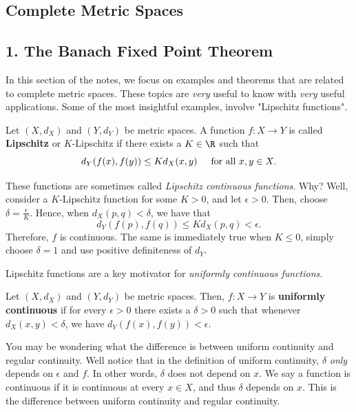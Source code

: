 
\subsection*{Complete Metric Spaces}

\subsection*{1.  The Banach Fixed Point Theorem}

In this section of the notes, we focus on examples and theorems that are related to complete metric spaces. These topics are \textit{very} useful to know with \textit{very} useful applications. Some of the most insightful examples, involve "Lipschitz functions".

\begin{definition}[Lipschitz]
Let $(X,d_X)$ and $(Y, d_Y)$ be metric spaces. A function $f: X\to Y$ is called \textbf{Lipschitz} or $K$-Lipschitz if there exists a $K\in \R$ such that 
\[
d_Y(f(x),f(y)) \leq Kd_X(x,y)\hspace{.5cm} \text{for all }x,y\in X.
\]
\end{definition}

These functions are sometimes called \textit{Lipschitz continuous functions}. Why? Well, consider a $K$-Lipschitz function for some $K>0$, and let $\epsilon >0$. Then, choose $\delta = \frac{\epsilon}{K}$. Hence, when $d_X(p,q) < \delta$, we have that 
\[
d_Y(f(p),f(q)) \leq Kd_X(p,q) < \epsilon.
\]
Therefore, $f$ is continuous. The same is immediately true when $K\leq 0$, simply choose $\delta = 1$ and use positive definiteness of $d_Y$.

Lipschitz functions are a key motivator for \textit{uniformly continuous functions}.

\begin{definition}
Let $(X,d_X)$ and $(Y,d_Y)$ be metric spaces. Then, $f:X\to Y$ is \textbf{uniformly continuous} if for every $\epsilon>0$ there exists a $\delta >0$ such that whenever $d_X(x,y) < \delta$, we have $d_Y(f(x),f(y)) < \epsilon$.
\end{definition}

\begin{remark}
You may be wondering what the difference is between uniform continuity and regular continuity. Well notice that in the definition of uniform continuity, $\delta$ \textit{only} depends on $\epsilon$ and $f.$ In other words, $\delta$ does not depend on $x$. We say a function is continuous if it is continuous at every $x\in X$, and thus $\delta$ depends on $x$. This is the difference between uniform continuity and regular continuity. 
\end{remark}


